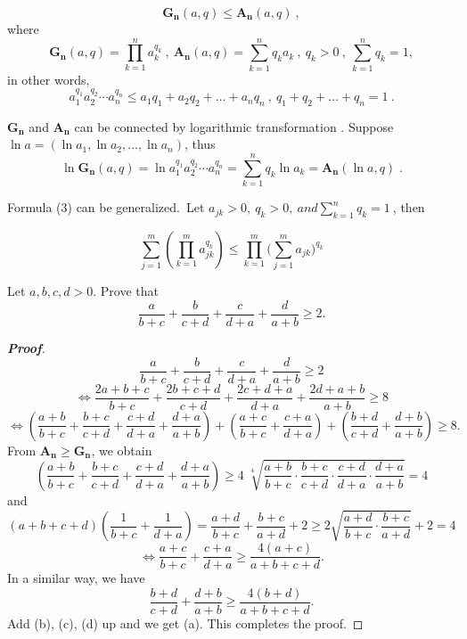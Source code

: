 \documentclass[a4paper]{report}
\begin{document}
	\begin{thr}
		
		\begin{equation}
		\mathbf{G_n}(a,q)\leqslant \mathbf{A_n}(a,q)\ ,
		\end{equation}
    where
    \[\mathbf{G_n}(a,q)=\prod_{k=1}^{n} a_k^{q_k}\ ,\ 
	\mathbf{A_n}(a,q)=\sum_{k=1}^{n} q_k a_k\ ,\ 
    q_k>0\ ,\ \sum_{k=1}^{n} q_k =1  ,\]
	in other words,
    \[a_1^{q_1} a_2^{q_2}\cdots a_n^{q_n}
    \leqslant a_1q_1+a_2q_2+\dots +a_nq_n
    \ ,\ q_1+q_2+\dots +q_n=1
    \ .\]
       	
    \end{thr}
    $\mathbf{G_n}$ and $\mathbf{A_n}$ can be connected by logarithmic transformation . 
    Suppose $\ln a=(\ln a_1,\ln a_2,\dots ,\ln a_n)$,
    thus \[\ln \mathbf{G_n}(a,q)=\ln a_1^{q_1} a_2^{q_2}
    \cdots a_n^{q_n}=\sum_{k=1}^n q_k \ln a_k=\mathbf{A_n}(\ln a,q)\;.\]
    
	
	Formula (3) can be generalized.\ Let $ a_{jk} > 0,\ q_k >0,\ and
	\sum\limits_{k=1}^n q_k = 1\ $,
	then
	
	      \begin{equation}
	      \sum_{j=1}^{m}\left(\prod_{k=1}^{m} a_{jk}^{q_k} \right)\leqslant
	     \prod_{k=1}^{m}\Bigg(\sum_{j=1}^{m} a_{jk} \Bigg)^{q_k}
	      \end{equation}

\par  \quad

\begin{myex}
Let $a,b,c,d >0$. Prove that
\[\frac{a}{b+c} +\frac{b}{c+d} +\frac{c}{d+a} +\frac{d}{a+b} \geqslant 2.\]
\end{myex}
\begin{proof}[\bf{Proof}]
	\[\frac{a}{b+c} +\frac{b}{c+d} +\frac{c}{d+a} +\frac{d}{a+b} \geqslant 2\]
    \[\iff \frac{2a+b+c}{b+c} +\frac{2b+c+d}{c+d} +\frac{2c+d+a}{d+a} +\frac{2d+a+b}{a+b} \geqslant 8\]
    \begin{equation}
\iff \left(\frac{a+b}{b+c} +\frac{b+c}{c+d}+\frac{c+d}{d+a}+\frac{d+a}{a+b}\right)+\left(\frac{a+c}{b+c} +\frac{c+a}{d+a}\right) +\left(\frac{b+d}{c+d}+\frac{d+b}{a+b}\right)  \geqslant 8.\tag{a}
\end{equation}
    From $\mathbf{A_n}\geqslant \mathbf{G_n}$, we obtain
    \begin{equation}
\left(\frac{a+b}{b+c} +\frac{b+c}{c+d}+\frac{c+d}{d+a}+\frac{d+a}{a+b}\right)\geqslant 4\;\sqrt[4]{\frac{a+b}{b+c}\cdot\frac{b+c}{c+d}\cdot\frac{c+d}{d+a}\cdot\frac{d+a}{a+b}}=4\tag{b}
\end{equation}
and
\[\left(a+b+c+d\right)\left(\frac{1}{b+c}+\frac{1}{d+a}\right)=\frac{a+d}{b+c}+\frac{b+c}{a+d}+2\geqslant2\sqrt{\frac{a+d}{b+c}\cdot\frac{b+c}{a+d}}+2=4\]
    \begin{equation}
\iff\frac{a+c}{b+c} +\frac{c+a}{d+a}\geqslant\frac{4\left(a+c\right)}{a+b+c+d}.\tag{c}
\end{equation}
    In a similar way, we have
    \begin{equation}
\frac{b+d}{c+d}+\frac{d+b}{a+b}\geqslant\frac{4\left(b+d\right)}{a+b+c+d}.\tag{d}
   \end{equation}
Add (b), (c), (d) up and we get (a). This completes
 the proof.
\end{proof}
\end{document}
